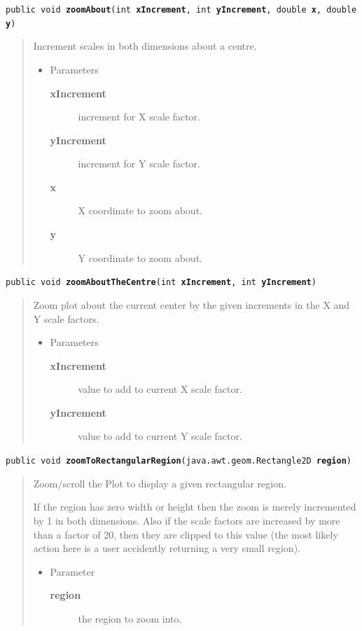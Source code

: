 \documentclass[twoside,11pt]{article}
\renewcommand{\_}{\texttt{\symbol{95}}}
\newcommand{\method}[1]{\texttt{#1}}
\newenvironment{desc}{\begin{quote}}{\end{quote}}
\begin{document}
\method{public void \textbf{zoomAbout}(\texttt{int} \textbf{xIncrement}, \texttt{int} \textbf{yIncrement}, \texttt{double} \textbf{x}, \texttt{double} \textbf{y})\label{l230}\label{l231}}
\begin{desc}Increment scales in both dimensions about a centre.
\begin{itemize}
\item{Parameters
  \begin{description}
   \item[\textbf{xIncrement}]{increment for X scale factor.}
   \item[\textbf{yIncrement}]{increment for Y scale factor.}
   \item[\textbf{x}]{X coordinate to zoom about.}
   \item[\textbf{y}]{Y coordinate to zoom about.}
  \end{description}}
\end{itemize}
\end{desc}

\method{public void \textbf{zoomAboutTheCentre}(\texttt{int} \textbf{xIncrement}, \texttt{int} \textbf{yIncrement})\label{l232}\label{l233}}
\begin{desc}Zoom plot about the current center by the given increments in
 the X and Y scale factors.
\begin{itemize}
\item{Parameters
  \begin{description}
   \item[\textbf{xIncrement}]{value to add to current X scale factor.}
   \item[\textbf{yIncrement}]{value to add to current Y scale factor.}
  \end{description}}
\end{itemize}
\end{desc}

\method{public void \textbf{zoomToRectangularRegion}(\texttt{java.awt.geom.Rectangle2D} \textbf{region})\label{l234}\label{l235}}
\begin{desc}Zoom$/$scroll the Plot to display a given rectangular region.

 If the region has zero width or height then the zoom is merely
 incremented by 1 in both dimensions. Also if the scale factors
 are increased by more than a factor of 20, then they are
 clipped to this value (the most likely action here is a user
 accidently returning a very small region).
\begin{itemize}
\item{Parameter
  \begin{description}
   \item[\textbf{region}]{the region to zoom into.}
  \end{description}}
\end{itemize}
\end{desc}
\end{document}
